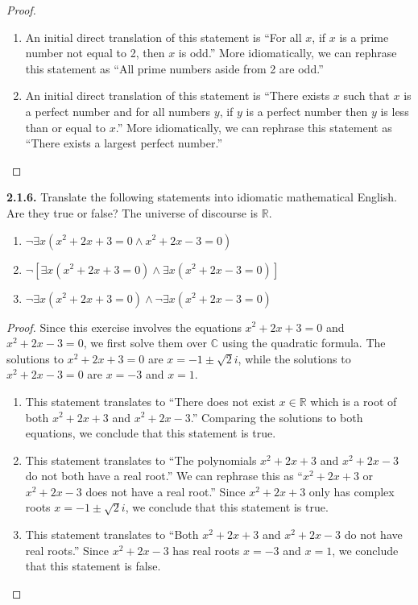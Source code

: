 \documentclass[12pt]{amsart}
\newenvironment{statement}[1]{\smallskip\noindent\color[rgb]{.6627, .3529, .6314} {\bf #1.}}{}
\theoremstyle{definition}
\theoremstyle{remark}
\newcommand{\BR}{\mathbb R}
\newcommand{\BC}{\mathbb C}
\begin{document}
\begin{proof}
\hfill
\begin{enumerate}
	\item An initial direct translation of this statement is 
	``For all $x$, if $x$ is a prime number not equal to 2, then $x$ is odd.''
	More idiomatically, we can rephrase this statement as ``All prime numbers aside from 2 are odd.''
	
	\item An initial direct translation of this statement is 
	``There exists $x$ such that $x$ is a perfect number and for all numbers $y$, if $y$ is a perfect number then $y$ is less than or equal to $x$.''
	More idiomatically, we can rephrase this statement as ``There exists a largest perfect number.''
\end{enumerate}
\end{proof}


\begin{statement}{2.1.6}
Translate the following statements into idiomatic mathematical English.
Are they true or false?
The universe of discourse is $\BR$.
\begin{enumerate}
	\item $\neg \exists x (x^2 + 2x + 3 = 0 \wedge x^2 + 2x - 3 = 0)$
	
	\item $\neg [\exists x (x^2 + 2x + 3 = 0) \wedge \exists x (x^2 + 2x - 3 = 0)]$
	
	\item $\neg \exists x (x^2 + 2x + 3 = 0) \wedge \neg \exists x (x^2 + 2x - 3 = 0)$
\end{enumerate}
\end{statement}

\begin{proof}
Since this exercise involves the equations $x^2 + 2x + 3 = 0$ and $x^2 + 2x - 3 = 0$, we first solve them over $\BC$ using the quadratic formula.
The solutions to $x^2 + 2x + 3 = 0$ are $x = -1 \pm \sqrt{2}i$,
while the solutions to $x^2 + 2x - 3 = 0$ are $x = -3$ and $x = 1$.
\begin{enumerate}
	\item This statement translates to ``There does not exist $x \in \BR$ which is a root of both $x^2 + 2x + 3$ and $x^2 + 2x - 3$.''
	Comparing the solutions to both equations, we conclude that this statement is true.
	
	\item This statement translates to ``The polynomials $x^2 + 2x + 3$ and $x^2 + 2x - 3$ do not both have a real root.''
	We can rephrase this as ``$x^2 + 2x + 3$ or $x^2 + 2x - 3$ does not have a real root.''
	Since $x^2 + 2x + 3$ only has complex roots $x = -1 \pm \sqrt{2}i$, we conclude that this statement is true.
	
	\item This statement translates to ``Both $x^2 + 2x + 3$ and $x^2 + 2x - 3$ do not have real roots.''
	Since $x^2 + 2x - 3$ has real roots $x = -3$ and $x = 1$, we conclude that this statement is false.
\end{enumerate}
\end{proof}
\end{document}
